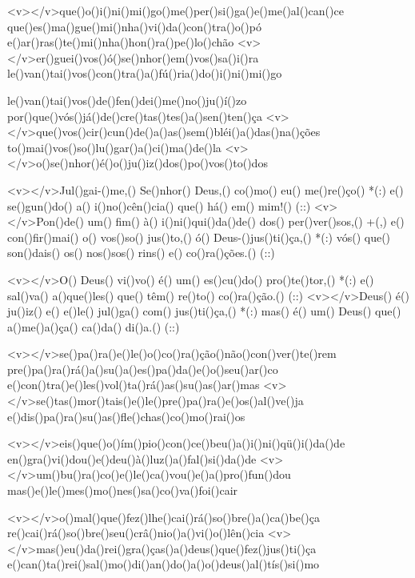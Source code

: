<v></v>que()o()i()ni()mi()go()me()per()si()ga()e()me()al()can()ce
que()es()ma()gue()mi()nha()vi()da()con()tra()o()pó
e()ar()ras()te()mi()nha()hon()ra()pe()lo()chão
<v></v>er()guei()vos()ó()se()nhor()em()vos()sa()i()ra
le()van()tai()vos()con()tra()a()fú()ria()do()i()ni()mi()go

le()van()tai()vos()de()fen()dei()me()no()ju()í()zo
por()que()vós()já()de()cre()tas()tes()a()sen()ten()ça
<v></v>que()vos()cir()cun()de()a()as()sem()bléi()a()das()na()ções
to()mai()vos()so()lu()gar()a()ci()ma()de()la
<v></v>o()se()nhor()é()o()ju()iz()dos()po()vos()to()dos

<v></v>Jul()gai-()me,() Se()nhor() Deus,() co()mo() eu() me()re()ço() *(:)
e() se()gun()do() a() i()no()cên()cia() que() há() em() mim!() (::)
<v></v>Pon()de() um() fim() à() i()ni()qui()da()de() dos() per()ver()sos,() +(,)
e() con()fir()mai() o() vos()so() jus()to,() ó() Deus-()jus()ti()ça,() *(:)
vós() que() son()dais() os() nos()sos() rins() e() co()ra()ções.() (::)

<v></v>O() Deus() vi()vo() é() um() es()cu()do() pro()te()tor,() *(:)
e() sal()va() a()que()les() que() têm() re()to() co()ra()ção.() (::)
<v></v>Deus() é() ju()iz() e() e()le() jul()ga() com() jus()ti()ça,() *(:)
mas() é() um() Deus() que() a()me()a()ça() ca()da() di()a.() (::)

<v></v>se()pa()ra()e()le()o()co()ra()ção()não()con()ver()te()rem
pre()pa()ra()rá()a()su()a()es()pa()da()e()o()seu()ar()co
e()con()tra()e()les()vol()ta()rá()as()su()as()ar()mas
<v></v>se()tas()mor()tais()e()le()pre()pa()ra()e()os()al()ve()ja
e()dis()pa()ra()su()as()fle()chas()co()mo()rai()os

<v></v>eis()que()o()ím()pio()con()ce()beu()a()i()ni()qü()i()da()de
en()gra()vi()dou()e()deu()à()luz()a()fal()si()da()de
<v></v>um()bu()ra()co()e()le()ca()vou()e()a()pro()fun()dou
mas()e()le()mes()mo()nes()sa()co()va()foi()cair

<v></v>o()mal()que()fez()lhe()cai()rá()so()bre()a()ca()be()ça
re()cai()rá()so()bre()seu()crâ()nio()a()vi()o()lên()cia
<v></v>mas()eu()da()rei()gra()ças()a()deus()que()fez()jus()ti()ça
e()can()ta()rei()sal()mo()di()an()do()a()o()deus()al()tís()si()mo